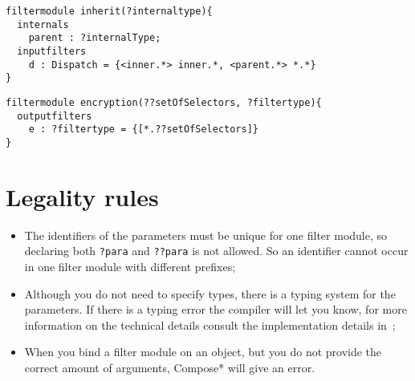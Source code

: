 \begin{lstlisting}[caption={Example of a generic inheritance filter module}, label = lst::ARM:fmp:example2,
style = listing, language=ComposeStar, float = tpb]
filtermodule inherit(?internaltype){
  internals
    parent : ?internalType;
  inputfilters
    d : Dispatch = {<inner.*> inner.*, <parent.*> *.*}
} 
\end{lstlisting}

\begin{lstlisting}[caption = {Example of an encryption filter}, label = lst::ARM:fmp:example3,
style = listing, language =ComposeStar, float = tpb]
filtermodule encryption(??setOfSelectors, ?filtertype){
  outputfilters
    e : ?filtertype = {[*.??setOfSelectors]}
} 
\end{lstlisting}

\section*{Legality rules}
\begin{itemize}[noitemsep]
\item The identifiers of the parameters must be unique for one filter module, so declaring both \lstinline!?para!
and \lstinline!??para! is not allowed. So an identifier cannot occur in one filter module with different prefixes;
\item Although you do not need to specify types, there is a typing system for the parameters. If there is a
typing error the compiler will let you know, for more information on the technical details  consult
the implementation details in~\cite{Doornenbal2006};
\item When you bind a filter module on an object, but you do not provide the correct amount of arguments, Compose*
will give an error.
\end{itemize}

